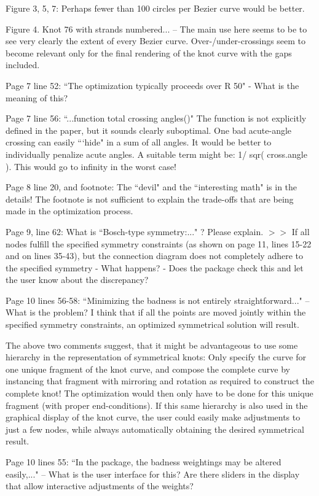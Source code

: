 \documentclass[12pt]{article}
\begin{document}
Figure 3, 5, 7: Perhaps fewer than 100 circles per Bezier curve would
be better.


Figure 4.  Knot 76 with strands numbered... -- The main use here seems
to be to see very clearly the extent of every Bezier curve.
Over-/under-crossings seem to become relevant only for the final
rendering of the knot curve with the gaps included.

Page 7 line 52: ``The optimization typically proceeds over R 50" - What
is the meaning of this?

Page 7 line 56: ``...function total crossing angles()" The function is
not explicitly defined in the paper, but it sounds clearly suboptimal.
One bad acute-angle crossing can easily ```hide" in a sum of all angles.
It would be better to individually penalize acute angles.  A suitable
term might be: 1/ sqr( cross.angle ).  This would go to infinity in
the worst case!

Page 8 line 20, and footnote: The ``devil" and the ``interesting math"
is in the details!  The footnote is not sufficient to explain the
trade-offs that are being made in the optimization process.

Page 9, line 62: What is ``Bosch-type symmetry:..." ?  Please explain.
$>>$ If all nodes fulfill the specified symmetry constraints (as shown
on page 11, lines 15-22 and on lines 35-43), but the connection
diagram does not completely adhere to the specified symmetry - What
happens? - Does the package check this and let the user know about the
discrepancy?

Page 10 lines 56-58: ``Minimizing the badness is not entirely
straightforward..."  -- What is the problem?  I think that if all the
points are moved jointly within the specified symmetry constraints, an
optimized symmetrical solution will result.

{The above two comments suggest, that it might be advantageous to use
  some hierarchy in the representation of symmetrical knots: Only
  specify the curve for one unique fragment of the knot curve, and
  compose the complete curve by instancing that fragment with
  mirroring and rotation as required to construct the complete knot!
  The optimization would then only have to be done for this unique
  fragment (with proper end-conditions).  If this same hierarchy is
  also used in the graphical display of the knot curve, the user could
  easily make adjustments to just a few nodes, while always
  automatically obtaining the desired symmetrical result.}

Page 10 lines 55: ``In the package, the badness weightings may be
altered easily,..."  -- What is the user interface for this?  Are
there sliders in the display that allow interactive adjustments of the
weights?
\end{document}
